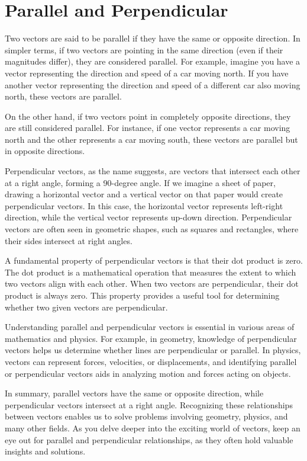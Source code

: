 \chapter{Parallel and Perpendicular}

Two vectors are said to be parallel if they have the same or opposite direction. In simpler terms, if two vectors are pointing in the same direction (even if their magnitudes differ), they are considered parallel. For example, imagine you have a vector representing the direction and speed of a car moving north. If you have another vector representing the direction and speed of a different car also moving north, these vectors are parallel.

On the other hand, if two vectors point in completely opposite directions, they are still considered parallel. For instance, if one vector represents a car moving north and the other represents a car moving south, these vectors are parallel but in opposite directions.

Perpendicular vectors, as the name suggests, are vectors that intersect each other at a right angle, forming a 90-degree angle. If we imagine a sheet of paper, drawing a horizontal vector and a vertical vector on that paper would create perpendicular vectors. In this case, the horizontal vector represents left-right direction, while the vertical vector represents up-down direction. Perpendicular vectors are often seen in geometric shapes, such as squares and rectangles, where their sides intersect at right angles.

A fundamental property of perpendicular vectors is that their dot product is zero. The dot product is a mathematical operation that measures the extent to which two vectors align with each other. When two vectors are perpendicular, their dot product is always zero. This property provides a useful tool for determining whether two given vectors are perpendicular.

Understanding parallel and perpendicular vectors is essential in various areas of mathematics and physics. For example, in geometry, knowledge of perpendicular vectors helps us determine whether lines are perpendicular or parallel. In physics, vectors can represent forces, velocities, or displacements, and identifying parallel or perpendicular vectors aids in analyzing motion and forces acting on objects.

In summary, parallel vectors have the same or opposite direction, while perpendicular vectors intersect at a right angle. Recognizing these relationships between vectors enables us to solve problems involving geometry, physics, and many other fields. As you delve deeper into the exciting world of vectors, keep an eye out for parallel and perpendicular relationships, as they often hold valuable insights and solutions.
